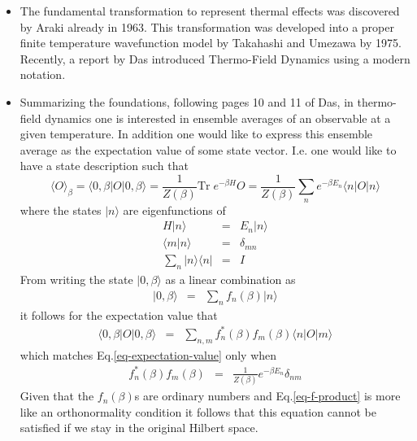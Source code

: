 \documentclass[aip,graphicx]{revtex4-1}
\begin{document}
\begin{itemize}
    \item The fundamental transformation to represent thermal effects was discovered by Araki\cite{Araki_1963} already in 1963. This transformation was developed into a proper finite temperature wavefunction model by Takahashi and Umezawa\cite{Takahashi_1975,Takahashi_1996} by 1975. Recently, a report by Das\cite{Das_2000} introduced Thermo-Field Dynamics using a modern notation.
    \item Summarizing the foundations, following pages 10 and 11 of Das\cite{Das_2000}, in thermo-field dynamics one is interested in ensemble averages of an observable at a given temperature. In addition one would like to express this ensemble average as the expectation value of some state vector. I.e. one would like to have a state description such that
    \begin{equation}
    \label{eq-expectation-value}
    \langle O \rangle_\beta = \langle 0,\beta|O|0,\beta\rangle 
    = \frac{1}{Z(\beta)} \mathrm{Tr}\; e^{-\beta H}O
    = \frac{1}{Z(\beta)} \sum_n e^{-\beta E_n} \langle n|O|n \rangle
    \end{equation}
    where the states $|n\rangle$ are eigenfunctions of
    \begin{eqnarray}
    H |n\rangle &=& E_n |n\rangle \\
    \langle m|n \rangle &=& \delta_{mn} \\
    \sum_n |n\rangle\langle n| &=& I
    \end{eqnarray}
    From writing the state $|0,\beta\rangle$ as a linear combination as
    \begin{eqnarray}
    |0,\beta\rangle &=& \sum_n f_n(\beta)|n\rangle
    \end{eqnarray}
    it follows for the expectation value that
    \begin{eqnarray}
    \langle 0,\beta| O | 0,\beta \rangle
    &=& \sum_{n,m}f^*_n(\beta)f_m(\beta)\langle n |O|m \rangle
    \end{eqnarray}
    which matches Eq.\ref{eq-expectation-value} only when
    \begin{eqnarray}
    \label{eq-f-product}
    f^*_n(\beta)f_m(\beta) &=& \frac{1}{Z(\beta)} e^{-\beta E_n}\delta_{nm}
    \end{eqnarray}
    Given that the $f_n(\beta)$s are ordinary numbers and Eq.\ref{eq-f-product} is more like an orthonormality condition it follows that this equation cannot be satisfied if we stay in the original Hilbert space. 
    

\end{itemize}
\end{document}
